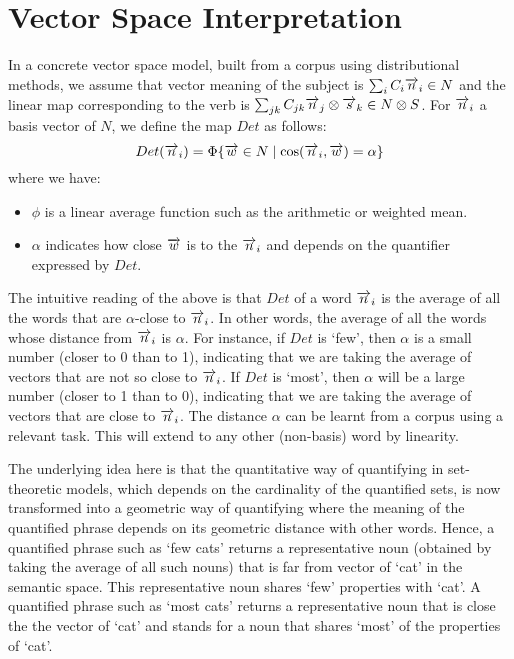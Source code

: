 \section{Vector Space Interpretation}


In a concrete vector space model, built from a corpus using distributional methods, we assume that  vector meaning of the subject is $\sum_i C_i \overrightarrow{n}_i \in N$ and the linear map corresponding to the verb is $\sum_{jk} C_{jk} \overrightarrow{n}_j \otimes \overrightarrow{s}_k \in N \otimes S$.  For $\overrightarrow{n}_i$ a basis vector of $N$, we define  the map $Det$  as follows:
\[
Det(\overrightarrow{n}_i) = \Phi \{\overrightarrow{w} \in N \mid \cos(\overrightarrow{n}_i, \overrightarrow{w}) = \alpha\}
\]
where we have:
\begin{itemize}
\item  $\phi$ is a linear average function such as the   arithmetic or weighted mean. 
\item  $\alpha$ indicates how close $\overrightarrow{w}$ is to the $\overrightarrow{n}_i$ and depends on the quantifier expressed by $Det$. 
\end{itemize}

\noindent
The intuitive reading of the above is that $Det$ of a word $\overrightarrow{n}_i$ is the average of all the words that are $\alpha$-close to $\overrightarrow{n}_i$. In other words, the average of all the words  whose distance from $\overrightarrow{n}_i$ is $\alpha$.  For instance, if $Det$ is `few', then $\alpha$ is a small number (closer to 0 than to 1), indicating that we are taking the average of vectors that are not so close to $\overrightarrow{n}_i$. If $Det$ is `most', then $\alpha$ will be a large number (closer to 1 than to 0), indicating that we are taking the average of vectors that are close to $\overrightarrow{n}_i$. The distance $\alpha$ can be learnt from a corpus using a relevant task. This will extend to any other (non-basis) word by linearity.  

The underlying idea here is that the quantitative way of quantifying in set-theoretic models, which depends on the cardinality of the quantified sets, is now transformed into a geometric way of quantifying where the meaning of the quantified phrase depends on its geometric distance with other words. Hence, a quantified phrase such as `few cats' returns a representative noun (obtained by taking the average of all such nouns) that is far from vector of  `cat'  in the semantic space. This representative noun shares `few' properties with `cat'. A quantified phrase such as `most cats' returns a representative noun that is close the the vector of `cat' and stands for a noun that shares `most' of the properties of `cat'. 


